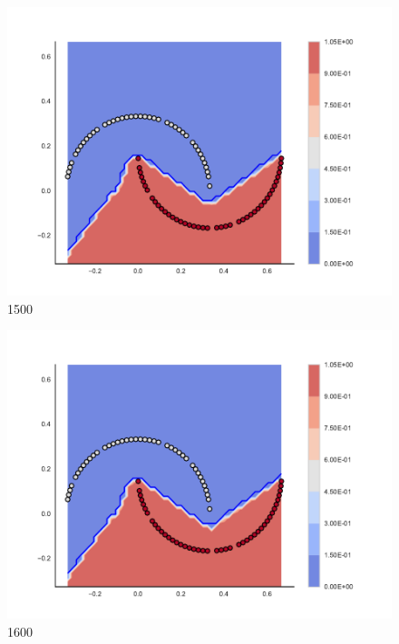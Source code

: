 \begin{subfigure}[b]{0.09\textwidth}
    \includegraphics[clip, trim=2.35cm 1.75cm 4.5cm 0cm,width=\textwidth]{img/convergence/1500.pdf}
    \caption{1500}
    \label{fig:convergence_1500}
\end{subfigure}
%
\begin{subfigure}[b]{0.09\textwidth}
    \includegraphics[clip, trim=2.35cm 1.75cm 4.5cm 0cm,width=\textwidth]{img/convergence/1600.pdf}
    \caption{1600}
    \label{fig:convergence_1600}
\end{subfigure}
%

